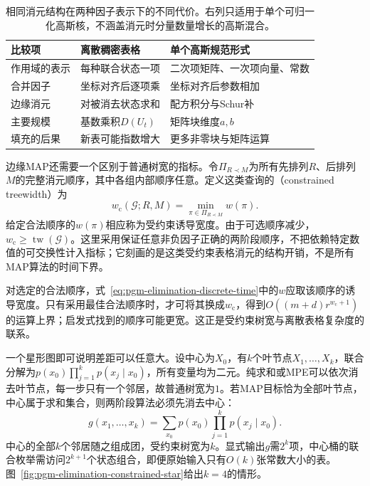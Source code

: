\begin{table}[htbp]
  \centering
  \begin{tabularx}{\linewidth}{@{}lXX@{}}
    \toprule
    比较项 & 离散稠密表格 & 单个高斯规范形式\\
    \midrule
    作用域的表示 & 每种联合状态一项 & 二次项矩阵、一次项向量、常数\\
    合并因子 & 坐标对齐后逐项乘 & 坐标对齐后参数相加\\
    边缘消元 & 对被消去状态求和 & 配方积分与Schur补\\
    主要规模 & 基数乘积$D(U_t)$ & 矩阵块维度$a,b$\\
    填充的后果 & 新表可能指数增大 & 更多非零块与矩阵运算\\
    \bottomrule
  \end{tabularx}
  \caption{相同消元结构在两种因子表示下的不同代价。右列只适用于单个可归一化高斯核，不涵盖消元时分量数量增长的高斯混合。}
  \label{tab:pgm-elimination-representation-cost}
\end{table}

边缘MAP还需要一个区别于普通树宽的指标。令$\Pi_{R\prec M}$为所有先排列$R$、后排列$M$的完整消元顺序，其中各组内部顺序任意。定义这类查询的（constrained treewidth）为
\begin{equation}
  w_{\mathrm{c}}(\mathcal{G};R,M)
  =\min_{\pi\in\Pi_{R\prec M}}w(\pi).
  \label{eq:pgm-elimination-constrained-width}
\end{equation}
给定合法顺序的$w(\pi)$相应称为受约束诱导宽度。由于可选顺序减少，$w_{\mathrm{c}}\geq\operatorname{tw}(\mathcal{G})$。这里采用保证任意非负因子正确的两阶段顺序，不把依赖特定数值的可交换性计入指标；它刻画的是这类受约束表格消元的结构开销，不是所有MAP算法的时间下界。

对选定的合法顺序，式~\eqref{eq:pgm-elimination-discrete-time}中的$w$应取该顺序的诱导宽度。只有采用最佳合法顺序时，才可将其换成$w_{\mathrm{c}}$，得到$O((m+d)r^{w_{\mathrm{c}}+1})$的运算上界；启发式找到的顺序可能更宽。这正是受约束树宽与离散表格复杂度的联系。

一个星形图即可说明差距可以任意大。设中心为$X_0$，有$k$个叶节点$X_1,\ldots,X_k$，联合分解为$p(x_0)\prod_{j=1}^k p(x_j\mid x_0)$，所有变量均为二元。纯求和或MPE可以依次消去叶节点，每一步只有一个邻居，故普通树宽为$1$。若MAP目标恰为全部叶节点，中心属于求和集合，则两阶段算法必须先消去中心：
\begin{equation}
  g(x_1,\ldots,x_k)
  =\sum_{x_0}p(x_0)\prod_{j=1}^{k}p(x_j\mid x_0).
  \label{eq:pgm-elimination-star-map}
\end{equation}
中心的全部$k$个邻居随之组成团，受约束树宽为$k$。显式输出$g$需$2^k$项，中心桶的联合枚举需访问$2^{k+1}$个状态组合，即便原始输入只有$O(k)$张常数大小的表。图~\ref{fig:pgm-elimination-constrained-star}给出$k=4$的情形。

